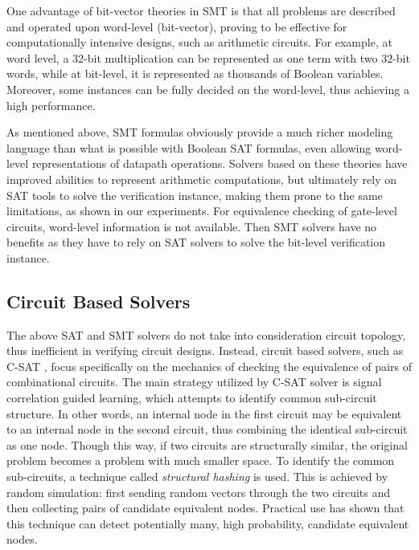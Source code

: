 One advantage of bit-vector theories in SMT is that all problems are described and operated upon 
word-level (bit-vector), proving to be effective for computationally intensive designs, such as arithmetic circuits. 
For example, at word level, a $32$-bit multiplication can be represented as one term with two $32$-bit words,
while at bit-level, it is represented as thousands of Boolean variables. Moreover, some instances can be fully decided on the word-level, 
thus achieving a high performance. 

As mentioned above, SMT formulas obviously provide a much richer modeling language than what is possible with Boolean SAT formulas, 
even allowing word-level representations of datapath operations. Solvers based on these
theories \cite{yices} \cite{mathsat4} \cite{boolector} \cite{beaver} have improved abilities to represent
arithmetic computations, but ultimately rely on SAT tools to solve the verification instance, making them prone to the same limitations,
as shown in our experiments.
For equivalence checking of gate-level circuits, word-level information is not available. Then SMT solvers have no benefits as they have to 
rely on SAT solvers to solve the bit-level verification instance. 

\subsection{Circuit Based Solvers}
The above SAT and SMT solvers do not take into consideration circuit topology, thus inefficient in verifying circuit designs.
Instead, circuit based solvers, such as C-SAT \cite{csat} \cite{csat:dac}, focus specifically on the mechanics of checking the equivalence 
of pairs of combinational circuits.
The main strategy utilized by C-SAT solver is signal correlation guided learning, 
which attempts to identify common  sub-circuit structure. In other words, an internal node in the first circuit
may be equivalent to an internal node in the second circuit, thus combining the identical sub-circuit as one node.
Though this way, if two circuits are structurally similar, the original problem becomes a problem with much smaller space.
To identify the common sub-circuits, a technique called {\it structural hashing} \cite{abc} is used. This is achieved by random simulation:
first sending random vectors through the two circuits and then collecting pairs of candidate equivalent nodes.
Practical use \cite{abc} has shown that this technique can detect potentially many, high probability, candidate equivalent nodes.

